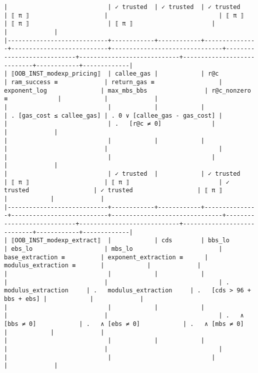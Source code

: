 \documentclass[varwidth=\maxdimen,margin=0.5cm,multi={verbatim}]{standalone}
\begin{document}
\begin{verbatim}
|                            | ✓ trusted  | ✓ trusted  | ✓ trusted     | ⟦ π ⟧                     |                               | ⟦ π ⟧                      | ⟦ π ⟧                      | ⟦ π ⟧                      |            |             |
|----------------------------+------------+------------+---------------+---------------------------+-------------------------------+----------------------------+----------------------------+----------------------------+------------+-------------|
| ⟦OOB_INST_modexp_pricing⟧  | callee_gas |            | r@c           | ram_success ≡             | return_gas ≡                  | exponent_log               | max_mbs_bbs                | r@c_nonzero ≡              |            |             |
|                            |            |            |               | . [gas_cost ≤ callee_gas] | . 0 ∨ [callee_gas - gas_cost] |                            |                            | .   [r@c ≠ 0]              |            |             |
|                            |            |            |               |                           |                               |                            |                            |                            |            |             |
|                            | ✓ trusted  |            | ✓ trusted     | ⟦ π ⟧                     | ⟦ π ⟧                         | ✓ trusted                  | ✓ trusted                  | ⟦ π ⟧                      |            |             |
|----------------------------+------------+------------+---------------+---------------------------+-------------------------------+----------------------------+----------------------------+----------------------------+------------+-------------|
| ⟦OOB_INST_modexp_extract⟧  |            | cds        | bbs_lo        | ebs_lo                    | mbs_lo                        | base_extraction ≡          | exponent_extraction ≡      | modulus_extraction ≡       |            |             |
|                            |            |            |               |                           |                               | .   modulus_extraction     | .   modulus_extraction     | .   [cds > 96 + bbs + ebs] |            |             |
|                            |            |            |               |                           |                               | .   ∧ [bbs ≠ 0]            | .   ∧ [ebs ≠ 0]            | .   ∧ [mbs ≠ 0]            |            |             |
|                            |            |            |               |                           |                               |                            |                            |                            |            |             |

\end{verbatim}
\end{document}
